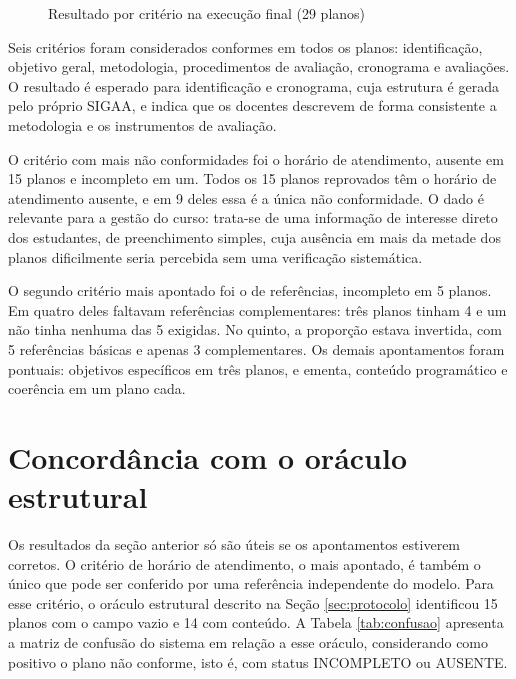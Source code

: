 \begin{figure}[htbp]
\centering
\caption{Resultado por critério na execução final (29 planos)}
\label{fig:criterios}

\end{figure}

Seis critérios foram considerados conformes em todos os planos: identificação, objetivo geral, metodologia, procedimentos de avaliação, cronograma e avaliações. O resultado é esperado para identificação e cronograma, cuja estrutura é gerada pelo próprio SIGAA, e indica que os docentes descrevem de forma consistente a metodologia e os instrumentos de avaliação.

O critério com mais não conformidades foi o horário de atendimento, ausente em 15 planos e incompleto em um. Todos os 15 planos reprovados têm o horário de atendimento ausente, e em 9 deles essa é a única não conformidade. O dado é relevante para a gestão do curso: trata-se de uma informação de interesse direto dos estudantes, de preenchimento simples, cuja ausência em mais da metade dos planos dificilmente seria percebida sem uma verificação sistemática.

O segundo critério mais apontado foi o de referências, incompleto em 5 planos. Em quatro deles faltavam referências complementares: três planos tinham 4 e um não tinha nenhuma das 5 exigidas. No quinto, a proporção estava invertida, com 5 referências básicas e apenas 3 complementares. Os demais apontamentos foram pontuais: objetivos específicos em três planos, e ementa, conteúdo programático e coerência em um plano cada.

\section{Concordância com o oráculo estrutural}
\label{sec:res-oraculo}

Os resultados da seção anterior só são úteis se os apontamentos estiverem corretos. O critério de horário de atendimento, o mais apontado, é também o único que pode ser conferido por uma referência independente do modelo. Para esse critério, o oráculo estrutural descrito na Seção \ref{sec:protocolo} identificou 15 planos com o campo vazio e 14 com conteúdo. A Tabela \ref{tab:confusao} apresenta a matriz de confusão do sistema em relação a esse oráculo, considerando como positivo o plano não conforme, isto é, com status INCOMPLETO ou AUSENTE.

